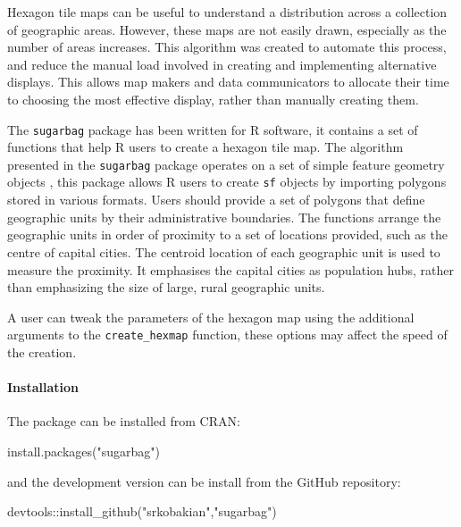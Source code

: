 Hexagon tile maps can be useful to understand a distribution across a
collection of geographic areas. However, these maps are not easily
drawn, especially as the number of areas increases. This algorithm was
created to automate this process, and reduce the manual load involved in
creating and implementing alternative displays. This allows map makers
and data communicators to allocate their time to choosing the most
effective display, rather than manually creating them.

The \texttt{sugarbag} package has been written for R software, it
contains a set of functions that help R users to create a hexagon tile
map. The algorithm presented in the \texttt{sugarbag} package operates
on a set of simple feature geometry objects \citep{sf}, this package
allows R users to create \texttt{sf} objects by importing polygons
stored in various formats. Users should provide a set of polygons that
define geographic units by their administrative boundaries. The
functions arrange the geographic units in order of proximity to a set of
locations provided, such as the centre of capital cities. The centroid
location of each geographic unit is used to measure the proximity. It
emphasises the capital cities as population hubs, rather than
emphasizing the size of large, rural geographic units.

A user can tweak the parameters of the hexagon map using the additional
arguments to the \texttt{create\_hexmap} function, these options may
affect the speed of the creation.

\hypertarget{installation}{%
\paragraph{Installation}\label{installation}}

The package can be installed from CRAN:

\begin{Schunk}
\begin{Sinput}
install.packages("sugarbag")
\end{Sinput}
\end{Schunk}

and the development version can be install from the GitHub repository:

\begin{Schunk}
\begin{Sinput}
devtools::install_github("srkobakian","sugarbag")
\end{Sinput}
\end{Schunk}

